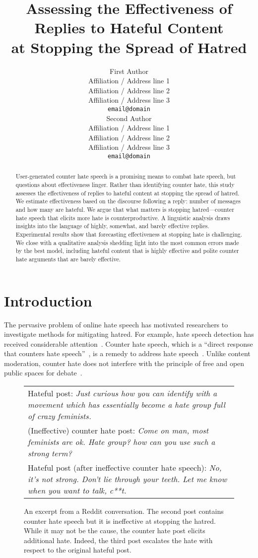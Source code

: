 \documentclass[11pt]{article}
\title{Assessing the Effectiveness of Replies to Hateful Content\\at Stopping the Spread of Hatred}
\author{First Author \\
  Affiliation / Address line 1 \\
  Affiliation / Address line 2 \\
  Affiliation / Address line 3 \\
  \texttt{email@domain} \\\And
  Second Author \\
  Affiliation / Address line 1 \\
  Affiliation / Address line 2 \\
  Affiliation / Address line 3 \\
  \texttt{email@domain} \\}
\begin{document}
\maketitle
\begin{abstract}
User-generated counter hate speech is a promising means to combat hate speech,
but questions about effectiveness linger.
Rather than identifying counter hate, this study assesses the effectiveness of replies to hateful content at stopping the spread of hatred.
We estimate effectiveness based on the discourse following a reply: number of messages and how many are hateful.
We argue that what matters is stopping hatred---counter hate speech that elicits more hate is counterproductive.
A linguistic analysis draws insights into 
the language of highly, somewhat, and barely effective replies.
Experimental results show that forecasting effectiveness at stopping hate is challenging.
We close with a qualitative analysis shedding light into the most common errors made by the best model,
including hateful content that is highly effective and polite counter hate arguments that are barely effective.
\end{abstract}

\section{Introduction}
The pervasive problem of online hate speech has motivated
researchers to investigate methods for mitigating hatred.
For example, hate speech detection has received considerable attention~\cite{schmidt-wiegand-2017-survey,10.1145/3232676}. 
Counter hate speech, which is a ``direct response that counters hate speech''~\cite{DBLP:conf/icwsm/MathewSTRSMG019},
is a remedy to address hate speech~\cite{richards2000counterspeech}. 
Unlike content moderation,
counter hate does not interfere with the principle of free and open public spaces for debate~\cite{DBLP:conf/icwsm/MathewSTRSMG019,schieb2016governing,chung-etal-2019-conan}.

\begin{figure}
	\small
	\centering
	\begin{tabular}{@{}p{\columnwidth}@{}}
		\toprule
		Hateful post:
		\emph{Just curious how you can identify with a movement which has essentially become a hate group full of crazy feminists.}  \\ \addlinespace
		(Ineffective) counter hate post:
		\emph{Come on man, most feminists are ok. Hate group? how can you use such a strong term?}  \\ \addlinespace
		Hateful post (after ineffective counter hate speech):
		\emph{No, it’s not strong. Don’t lie through your teeth. Let me know when you want to talk, c**t.} \\ 
		\bottomrule
	\end{tabular}
	\caption{
		An excerpt from a Reddit conversation.
		The second post contains counter hate speech but it is ineffective at stopping the hatred.
		While it may not be the cause, the counter hate post elicits additional hate.
		Indeed, the third post escalates the hate with respect to the original hateful post.
	}
	\label{f:problem-example}
\end{figure}
\end{document}
